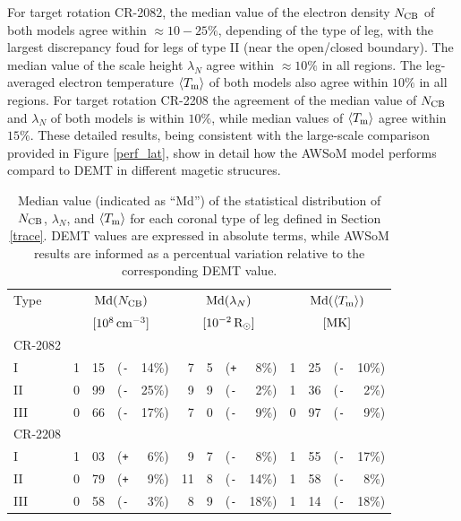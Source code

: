 \documentclass[namedreferences]{solarphysics}
\newcommand{\mrsun}{{\rm R_\odot}}
\newcommand{\med}{{\rm Md}}
\newcommand{\avgTe}{\left<\Tm\right>}
\newcommand{\MK}{{\rm MK}}
\newcommand{\lN}{\lambda_N}
\newcommand{\NCB}{N_{\rm CB}}
\newcommand{\Tm}{T_{\rm m}}
\newcommand{\aTm}{\left<\Tm\right>}
\newcommand{\Pl}{\texttt{+}}
\newcommand{\Mi}{\texttt{-}}
\begin{document}
\begin{article}
{For target rotation CR-2082, the median value of the electron density $\NCB$ of both models agree within $\approx 10-25\%$, {depending of the type of leg, with the largest discrepancy foud for legs of type II (near the open/closed boundary). The} median value of the scale height $\lN$ agree {within $\approx 10\%$ in all regions}. The leg-averaged electron temperature $\aTm$ of both models also agree {within $10\%$ in all regions}. For target rotation CR-2208 the agreement of the median value of $\NCB$ and $\lN$ of both models {is within $10\%$, while} median values of $\aTm$ agree within $15\%$. {These detailed results, being consistent with the large-scale comparison provided in Figure \ref{perf_lat}, show in detail how the AWSoM model performs compard to DEMT in different magetic strucures.}}


\begin{table}
\begin{tabular}{l r@{.}l@{\hskip 0.05in} r@{\hskip 0.01in} r  r@{.}l@{\hskip 0.05in} r@{\hskip 0.01in} r r@{.}l@{\hskip 0.05in} r@{\hskip 0.01in} r }
\hline
Type    & \multicolumn{4}{c}{$\med(\NCB)$}             & \multicolumn{4}{c}{$\med(\lN)$} & \multicolumn{4}{c}{$\med(\avgTe)$} \\
        & \multicolumn{4}{c}{$[10^8\,{\rm cm}^{-3}]$}  & \multicolumn{4}{c}{$[{\rm 10}^{-2}\,\mrsun]$} & \multicolumn{4}{c}{$[\MK]$} \\
\hline
CR-2082\\
I    & 1&15 &(\Mi&14\%)  &   7&5 &(\Pl&~8\%) &   1&25 &(\Mi&10\%) \\
II   & 0&99 &(\Mi&25\%)  &   9&9 &(\Mi&~2\%) &   1&36 &(\Mi&~2\%) \\
III  & 0&66 &(\Mi&17\%)  &   7&0 &(\Mi&~9\%) &   0&97 &(\Mi&~9\%) \\
\hline          
CR-2208\\
I    & 1&03 &(\Pl&~6\%)  &   9&7 &(\Mi&~8\%) &   1&55 &(\Mi&17\%) \\
II   & 0&79 &(\Pl&~9\%)  &  11&8 &(\Mi&14\%) &   1&58 &(\Mi&~8\%) \\
III  & 0&58 &(\Mi&~3\%)  &   8&9 &(\Mi&18\%) &   1&14 &(\Mi&18\%) \\
\end{tabular}
\caption{Median value (indicated as ``Md'') of the statistical distribution of $\NCB$, $\lN$, and $\aTm$ for each coronal type of leg defined in Section \ref{trace}. DEMT values are expressed in absolute terms, while AWSoM results are informed as a percentual variation relative to the corresponding DEMT value.}
\label{tabla_comp}
\end{table}


\end{article}
\end{document}
